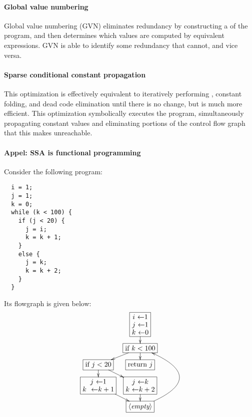 \documentclass{memo}
\begin{document}
\paragraph{Global value numbering}
Global value numbering (GVN) eliminates redundancy by constructing a  of the program, and then determines which values are computed by
equivalent expressions. GVN is able to identify some redundancy that
 cannot, and vice versa.

\paragraph{Sparse conditional constant propagation}
This optimization is effectively equivalent to iteratively performing
, constant folding, and dead code elimination until there is no
change, but is much more efficient. 
This optimization symbolically executes the program,
simultaneously propagating constant values and eliminating portions of the
control flow graph that this makes unreachable. 

\paragraph{Appel: SSA is functional programming}
Consider the following program:
\begin{verbatim}
  i = 1;
  j = 1;
  k = 0;
  while (k < 100) {
    if (j < 20) {
      j = i;
      k = k + 1;
    }
    else {
      j = k;
      k = k + 2;
    }
  }
\end{verbatim}
Its flowgraph is given below:
\[ \xymatrix@-0.5cm{
   &   *+[F]\txt{$i \ \la 1$ \\ $j \ \la 1$ \\ $k \ \la 0$} \ar[d]& &\\
 & *+[F]\txt{if $k < 100$} \ar[d]\ar[ld]& &\\
  *+[F]\txt{if $j < 20$} \ar[d]\ar[rd]& *+[F]\txt{return $j$}  &\\
  *+[F]\txt{$j \ \la 1$ \\ $k \ \ \la k +1$} \ar[rd]& 
           *+[F]\txt{$j \ \la k$\\ $k \ \la k + 2$} \ar[d] &&\\
   &       *+[F]\txt{$\arc{\mbox{empty}}$} \ar@/_13ex/[uuu] & &
}\]
\end{document}

